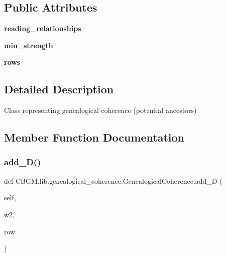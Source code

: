 \subsection*{Public Attributes}
\begin{DoxyCompactItemize}
\item 
\mbox{\label{classCBGM_1_1lib_1_1genealogical__coherence_1_1GenealogicalCoherence_a73556ba9b0c96280652dda16885f62d9}} 
{\bfseries reading\+\_\+relationships}
\item 
\mbox{\label{classCBGM_1_1lib_1_1genealogical__coherence_1_1GenealogicalCoherence_a552a14d4dab619fc94baeda2ac6929a5}} 
{\bfseries min\+\_\+strength}
\item 
\mbox{\label{classCBGM_1_1lib_1_1genealogical__coherence_1_1GenealogicalCoherence_aa94934fe6d1678d1f818e27e4a654b39}} 
{\bfseries rows}
\end{DoxyCompactItemize}


\subsection{Detailed Description}
\begin{DoxyVerb}Class representing genealogical coherence (potential ancestors)
\end{DoxyVerb}
 

\subsection{Member Function Documentation}
\mbox{\label{classCBGM_1_1lib_1_1genealogical__coherence_1_1GenealogicalCoherence_af457b8df3b3ff1dbd846114e352f6715}} 
\subsubsection{\texorpdfstring{add\+\_\+\+D()}{add\_D()}}
{\footnotesize\ttfamily def C\+B\+G\+M.\+lib.\+genealogical\+\_\+coherence.\+Genealogical\+Coherence.\+add\+\_\+D (\begin{DoxyParamCaption}\item[{}]{self,  }\item[{}]{w2,  }\item[{}]{row }\end{DoxyParamCaption})}

